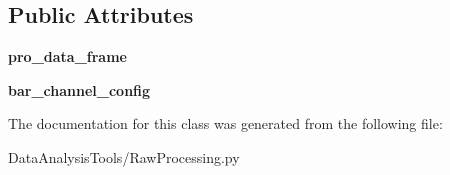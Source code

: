 \subsection*{Public Attributes}
\begin{DoxyCompactItemize}
\item 
\mbox{\label{classMIS_1_1DataAnalysisTools_1_1RawProcessing_1_1RawProcessing_a58bec80acaf838dbd825d8bbbd6a85c3}} 
{\bfseries pro\+\_\+data\+\_\+frame}
\item 
\mbox{\label{classMIS_1_1DataAnalysisTools_1_1RawProcessing_1_1RawProcessing_a14a4ad81ca69460736840ebfa4dc883d}} 
{\bfseries bar\+\_\+channel\+\_\+config}
\end{DoxyCompactItemize}


The documentation for this class was generated from the following file\+:\begin{DoxyCompactItemize}
\item 
Data\+Analysis\+Tools/Raw\+Processing.\+py\end{DoxyCompactItemize}
